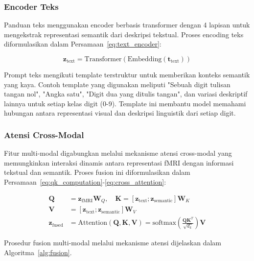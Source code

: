 \subsubsection{Encoder Teks}
Panduan teks menggunakan encoder berbasis transformer dengan 4 lapisan untuk mengekstrak representasi semantik dari deskripsi tekstual. Proses encoding teks diformulasikan dalam Persamaan~\ref{eq:text_encoder}:

\begin{equation}
\mathbf{z}_{\text{text}} = \text{Transformer}(\text{Embedding}(\mathbf{t}_{\text{text}}))
\label{eq:text_encoder}
\end{equation}

Prompt teks mengikuti template terstruktur untuk memberikan konteks semantik yang kaya. Contoh template yang digunakan meliputi "Sebuah digit tulisan tangan nol", "Angka satu", "Digit dua yang ditulis tangan", dan variasi deskriptif lainnya untuk setiap kelas digit (0-9). Template ini membantu model memahami hubungan antara representasi visual dan deskripsi linguistik dari setiap digit.

\subsubsection{Atensi Cross-Modal}
Fitur multi-modal digabungkan melalui mekanisme atensi cross-modal yang memungkinkan interaksi dinamis antara representasi fMRI dengan informasi tekstual dan semantik. Proses fusion ini diformulasikan dalam Persamaan~\ref{eq:qk_computation}-\ref{eq:cross_attention}:

\begin{align}
\mathbf{Q} &= \mathbf{z}_{\text{fMRI}} \mathbf{W}_Q, \quad \mathbf{K} = [\mathbf{z}_{\text{text}}; \mathbf{z}_{\text{semantic}}] \mathbf{W}_K \label{eq:qk_computation} \\
\mathbf{V} &= [\mathbf{z}_{\text{text}}; \mathbf{z}_{\text{semantic}}] \mathbf{W}_V \label{eq:v_computation} \\
\mathbf{z}_{\text{fused}} &= \text{Attention}(\mathbf{Q}, \mathbf{K}, \mathbf{V}) = \text{softmax}\left(\frac{\mathbf{Q}\mathbf{K}^T}{\sqrt{d_k}}\right)\mathbf{V} \label{eq:cross_attention}
\end{align}

Prosedur fusion multi-modal melalui mekanisme atensi dijelaskan dalam Algoritma~\ref{alg:fusion}.

